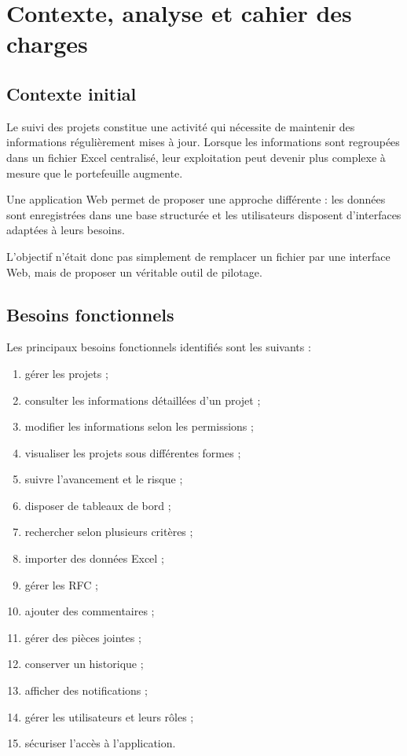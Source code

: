 \documentclass[12pt,a4paper,oneside]{report}
\begin{document}
\chapter{Contexte, analyse et cahier des charges}

\section{Contexte initial}

Le suivi des projets constitue une activité qui nécessite de maintenir des informations régulièrement mises à jour. Lorsque les informations sont regroupées dans un fichier Excel centralisé, leur exploitation peut devenir plus complexe à mesure que le portefeuille augmente.

Une application Web permet de proposer une approche différente : les données sont enregistrées dans une base structurée et les utilisateurs disposent d'interfaces adaptées à leurs besoins.

L'objectif n'était donc pas simplement de remplacer un fichier par une interface Web, mais de proposer un véritable outil de pilotage.

\section{Besoins fonctionnels}

Les principaux besoins fonctionnels identifiés sont les suivants :

\begin{enumerate}
    \item gérer les projets ;
    \item consulter les informations détaillées d'un projet ;
    \item modifier les informations selon les permissions ;
    \item visualiser les projets sous différentes formes ;
    \item suivre l'avancement et le risque ;
    \item disposer de tableaux de bord ;
    \item rechercher selon plusieurs critères ;
    \item importer des données Excel ;
    \item gérer les RFC ;
    \item ajouter des commentaires ;
    \item gérer des pièces jointes ;
    \item conserver un historique ;
    \item afficher des notifications ;
    \item gérer les utilisateurs et leurs rôles ;
    \item sécuriser l'accès à l'application.
\end{enumerate}
\end{document}
